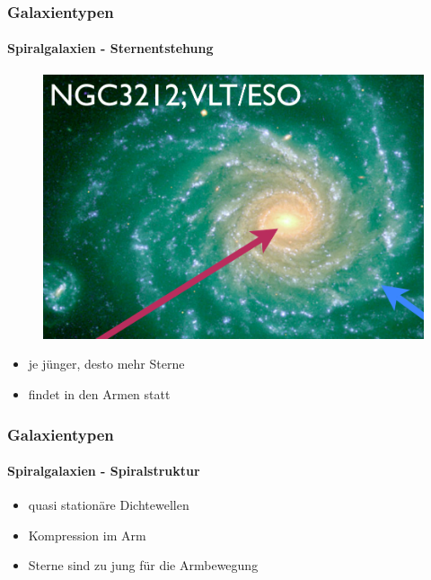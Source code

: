 \begin{frame}
\frametitle{Galaxientypen}
\framesubtitle{Spiralgalaxien - Sternentstehung}

\begin{figure}
\includegraphics[scale=0.25]{Sternentstehung_Spirale.png}
\end{figure}

\begin{itemize}
\item je jünger, desto mehr Sterne
\item findet in den Armen statt
\end{itemize}

\end{frame}


\begin{frame}
\frametitle{Galaxientypen}
\framesubtitle{Spiralgalaxien - Spiralstruktur}


\begin{itemize}
\item quasi stationäre Dichtewellen 
\item Kompression im Arm
\item Sterne sind zu jung für die Armbewegung
\end{itemize}




\end{frame}


